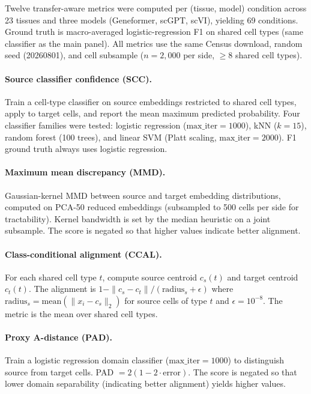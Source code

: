 \documentclass[11pt]{article}
\begin{document}
Twelve transfer-aware metrics were computed per (tissue, model) condition
across 23 tissues and three models (Geneformer, scGPT, scVI), yielding
69 conditions. Ground truth is macro-averaged logistic-regression F1 on
shared cell types (same classifier as the main panel). All metrics use
the same Census download, random seed (20260801), and cell subsample
($n = 2{,}000$ per side, $\geq 8$ shared cell types).

\paragraph{Source classifier confidence (SCC).} Train a cell-type
classifier on source embeddings restricted to shared cell types, apply
to target cells, and report the mean maximum predicted probability.
Four classifier families were tested: logistic regression
($\text{max\_iter} = 1000$), kNN ($k = 15$), random forest (100 trees),
and linear SVM (Platt scaling, $\text{max\_iter} = 2000$). F1 ground
truth always uses logistic regression.

\paragraph{Maximum mean discrepancy (MMD).} Gaussian-kernel MMD between
source and target embedding distributions, computed on PCA-50 reduced
embeddings (subsampled to 500 cells per side for tractability). Kernel
bandwidth is set by the median heuristic on a joint subsample. The score
is negated so that higher values indicate better alignment.

\paragraph{Class-conditional alignment (CCAL).} For each shared cell
type $t$, compute source centroid $c_s(t)$ and target centroid $c_t(t)$.
The alignment is $1 - \|c_s - c_t\| / (\text{radius}_s + \epsilon)$
where $\text{radius}_s = \text{mean}(\|x_i - c_s\|_2)$ for source cells
of type $t$ and $\epsilon = 10^{-8}$. The metric is the mean over shared
cell types.

\paragraph{Proxy A-distance (PAD).} Train a logistic regression domain
classifier ($\text{max\_iter} = 1000$) to distinguish source from target
cells. PAD $= 2(1 - 2 \cdot \text{error})$. The score is negated so
that lower domain separability (indicating better alignment) yields
higher values.
\end{document}
